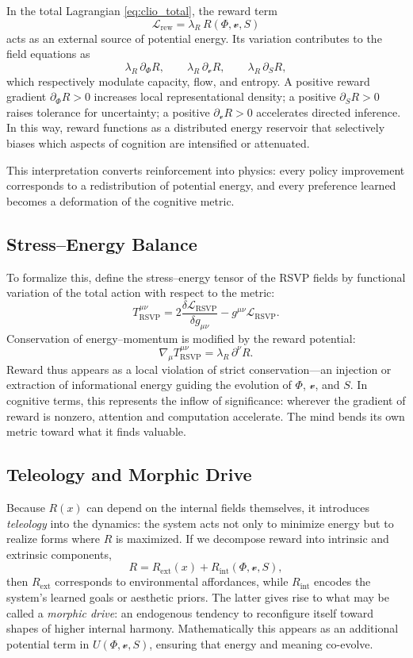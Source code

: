 \documentclass[11pt]{article}
\begin{document}
In the total Lagrangian \eqref{eq:clio_total}, the reward term
\[
\mathcal{L}_{\mathrm{rew}} = \lambda_R\,R(\Phi,\mathcal{v},S)
\]
acts as an external source of potential energy.  
Its variation contributes to the field equations as
\[
\lambda_R\,\partial_\Phi R,\qquad 
\lambda_R\,\partial_{\mathcal{v}} R,\qquad 
\lambda_R\,\partial_S R,
\]
which respectively modulate capacity, flow, and entropy.  
A positive reward gradient $\partial_\Phi R>0$ increases local representational density;  
a positive $\partial_S R>0$ raises tolerance for uncertainty;  
a positive $\partial_{\mathcal{v}} R>0$ accelerates directed inference.  
In this way, reward functions as a distributed energy reservoir that selectively biases which aspects of cognition are intensified or attenuated.

This interpretation converts reinforcement into physics: every policy improvement corresponds to a redistribution of potential energy, and every preference learned becomes a deformation of the cognitive metric.

\subsection{Stress--Energy Balance}

To formalize this, define the stress–energy tensor of the RSVP fields by functional variation of the total action with respect to the metric:
\[
T^{\mu\nu}_{\mathrm{RSVP}} 
= 2\frac{\delta\mathcal{L}_{\mathrm{RSVP}}}{\delta g_{\mu\nu}}
- g^{\mu\nu}\mathcal{L}_{\mathrm{RSVP}}.
\]
Conservation of energy--momentum is modified by the reward potential:
\[
\nabla_\mu T^{\mu\nu}_{\mathrm{RSVP}} 
= \lambda_R\,\partial^\nu R.
\]
Reward thus appears as a local violation of strict conservation—an injection or extraction of informational energy guiding the evolution of $\Phi$, $\mathcal{v}$, and $S$.  
In cognitive terms, this represents the inflow of significance: wherever the gradient of reward is nonzero, attention and computation accelerate.  
The mind bends its own metric toward what it finds valuable.

\subsection{Teleology and Morphic Drive}

Because $R(x)$ can depend on the internal fields themselves, it introduces \emph{teleology} into the dynamics: the system acts not only to minimize energy but to realize forms where $R$ is maximized.  
If we decompose reward into intrinsic and extrinsic components,
\[
R = R_{\mathrm{ext}}(x) + R_{\mathrm{int}}(\Phi,\mathcal{v},S),
\]
then $R_{\mathrm{ext}}$ corresponds to environmental affordances, while $R_{\mathrm{int}}$ encodes the system’s learned goals or aesthetic priors.  
The latter gives rise to what may be called a \emph{morphic drive}: an endogenous tendency to reconfigure itself toward shapes of higher internal harmony.  
Mathematically this appears as an additional potential term in $U(\Phi,\mathcal{v},S)$, ensuring that energy and meaning co-evolve.
\end{document}
